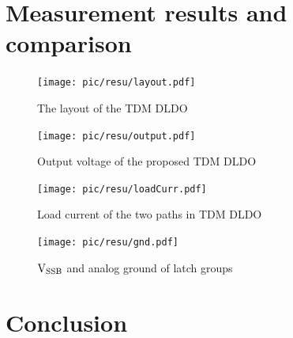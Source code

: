 \documentclass[journal]{IEEEtran}
\begin{document}
\section{Measurement results and comparison}
\begin{figure}[t!]
    \centering
    \texttt{[image: pic/resu/layout.pdf]}
    \caption{The layout of the TDM DLDO}
    \label{fig:layout}
\end{figure}
\begin{figure}[t!]
    \centering
    \texttt{[image: pic/resu/output.pdf]}
    \caption{Output voltage of the proposed TDM DLDO}
    \label{fig:output}
\end{figure}
\begin{figure}[t!]
    \centering
    \texttt{[image: pic/resu/loadCurr.pdf]}
    \caption{Load current of the two paths in TDM DLDO}
    \label{fig:curr}
\end{figure}
\begin{figure}[t!]
    \centering
    \texttt{[image: pic/resu/gnd.pdf]}
    \caption{$\rm V_{SSB}$ and analog ground of latch groups}
    \label{fig:gnd}
\end{figure}
\section{Conclusion}



\end{document}
